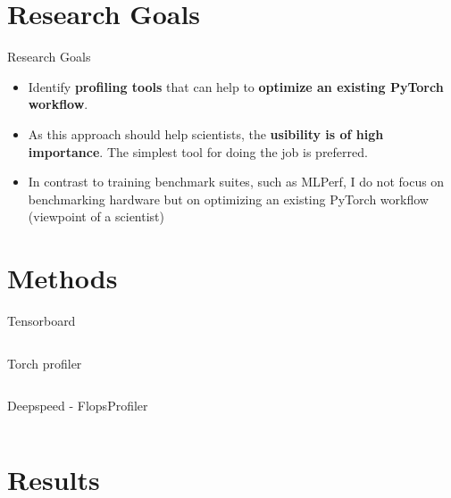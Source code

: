 \documentclass[compress,aspectratio=169]{beamer}
\begin{document}
\section{Research Goals}

\begin{frame}{Research Goals}

\begin{itemize}
    \item Identify \textbf{profiling tools} that can help to \textbf{optimize an existing PyTorch workflow}.
    \item As this approach should help scientists, the \textbf{usibility is of high importance}. The simplest tool for doing the job is preferred.
    \item In contrast to training benchmark suites, such as MLPerf, I do not focus on benchmarking hardware but on optimizing an existing PyTorch workflow (viewpoint of a scientist)
\end{itemize}

\end{frame}

\section{Methods}

\begin{frame}[fragile]{Tensorboard}
        \footnotesize\inputminted[xleftmargin=1em,linenos,fontsize=\scriptsize, highlightlines={1,3,9-12,14-16}]{python}{../../data/tensorboard.py}
\end{frame}

\begin{frame}[fragile]{Torch profiler}
        \footnotesize\inputminted[xleftmargin=1em,linenos,fontsize=\scriptsize, highlightlines={4-10,14,15}]{python}{../../data/profiler-torch.py}
\end{frame}

\begin{frame}[fragile]{Deepspeed - FlopsProfiler}
        \footnotesize\inputminted[xleftmargin=1em,linenos,fontsize=\scriptsize, highlightlines={1,3,4,8,9,11-18}]{python}{../../data/deepspeed.py}
\end{frame}

\section{Results}
\end{document}

